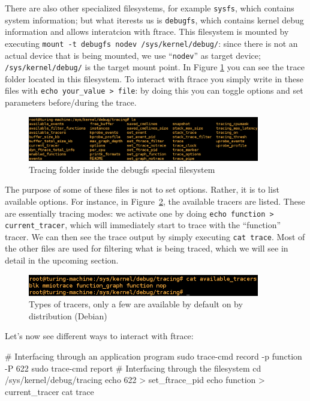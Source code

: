There are also other specialized filesystems, for example \verb|sysfs|, which contains system information; but what iterests us is \verb|debugfs|, which contains kernel debug information and allows interatcion  with ftrace. This filesystem is mounted by executing \verb|mount -t debugfs nodev /sys/kernel/debug/|: since there is not an actual device that is being mounted, we use ``\verb|nodev|'' as target device; \verb|/sys/kernel/debug/| is the target mount point. In Figure \ref{img:tracing} you can see the trace folder located in this filesystem. To interact with ftrace you simply write in these files with \verb|echo your_value > file|: by doing this you can toggle options and set parameters before/during the trace. 

\begin{figure}[ht]
\centering
\includegraphics[width=0.9\textwidth]{images/shell_tracing.png} 
\caption{Tracing folder inside the debugfs special filesystem}
\label{img:tracing}
\end{figure}

The purpose of some of these files is not to set options. Rather, it is to list available options. For instance, in Figure~\ref{img:tracers}, the available tracers are listed. These are essentially tracing modes: we activate one by doing \verb|echo function > current_tracer|, which will immediately start to trace with the ``function'' tracer. We can then see the trace output by simply executing \verb|cat trace|. Most of the other files are used for filtering what is being traced, which we will see in detail in the upcoming section.

\begin{figure}[ht]
\centering
\includegraphics[width=0.9\textwidth]{images/shell_tracers.png} 
\caption{Types of tracers, only a few are available by default on by distribution (Debian)}
\label{img:tracers}
\end{figure}

Let's now see different ways to interact with ftrace:
\begin{codebash}
# Interfacing through an application program
sudo trace-cmd record -p function -P 622
sudo trace-cmd report
# Interfacing through the filesystem
cd /sys/kernel/debug/tracing
echo 622 > set_ftrace_pid
echo function > current_tracer
cat trace
\end{codebash}


